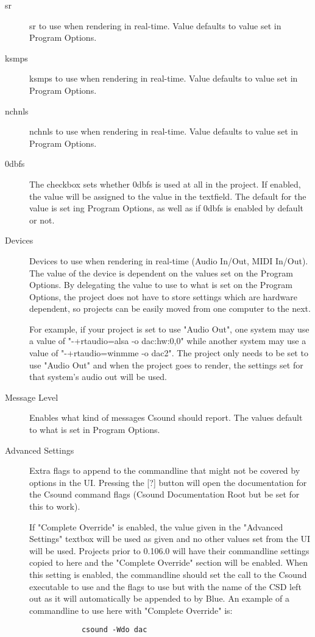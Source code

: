 \begin{description}
\item[sr]
sr to use when rendering in real-time. Value defaults to value set in
Program Options.
\item[ksmps]
ksmps to use when rendering in real-time. Value defaults to value set in
Program Options.
\item[nchnls]
nchnls to use when rendering in real-time. Value defaults to value set
in Program Options.
\item[0dbfs]
The checkbox sets whether 0dbfs is used at all in the project. If
enabled, the value will be assigned to the value in the textfield. The
default for the value is set ing Program Options, as well as if 0dbfs is
enabled by default or not.
\item[Devices]
Devices to use when rendering in real-time (Audio In/Out, MIDI In/Out).
The value of the device is dependent on the values set on the Program
Options. By delegating the value to use to what is set on the Program
Options, the project does not have to store settings which are hardware
dependent, so projects can be easily moved from one computer to the
next.

For example, if your project is set to use "Audio Out", one system may
use a value of "-+rtaudio=alsa -o dac:hw:0,0" while another system may
use a value of "-+rtaudio=winmme -o dac2". The project only needs to be
set to use "Audio Out" and when the project goes to render, the settings
set for that system's audio out will be used.
\item[Message Level]
Enables what kind of messages Csound should report. The values default
to what is set in Program Options.
\item[Advanced Settings]
Extra flags to append to the commandline that might not be covered by
options in the UI. Pressing the {[}?{]} button will open the
documentation for the Csound command flags (Csound Documentation Root
but be set for this to work).

If "Complete Override" is enabled, the value given in the "Advanced
Settings" textbox will be used as given and no other values set from the
UI will be used. Projects prior to 0.106.0 will have their commandline
settings copied to here and the "Complete Override" section will be
enabled. When this setting is enabled, the commandline should set the
call to the Csound executable to use and the flags to use but with the
name of the CSD left out as it will automatically be appended to by
Blue. An example of a commandline to use here with "Complete Override"
is:

\begin{verbatim}
            csound -Wdo dac
          
\end{verbatim}
\end{description}


